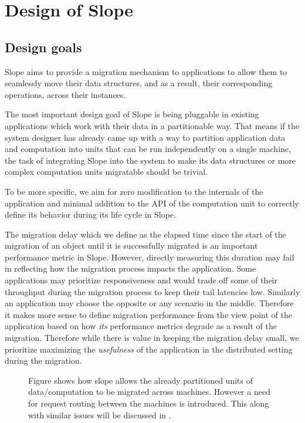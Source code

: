 \chapter{Design of Slope}
\label{chap:design}


\section{Design goals}

Slope aims to provide a migration mechanism to applications to allow them to
seamlessly move their data structures, and as a result, their corresponding
operations, across their instances.

The most important design goal of Slope is being pluggable in existing
applications which work with their data in a partitionable way. That means if
the system designer has already came up with a way to partition
application data and computation into units that can be run independently on a
single machine, the task of integrating Slope into the system to make its data
structures or more complex computation units migratable should be trivial.

To be more specific, we aim for zero modification to the internals of the
application and minimal addition to the API of the computation unit to
correctly define its behavior during its life cycle in Slope.

The migration delay which we define as the elapsed time since the start of the
migration of an object until it is successfully migrated is an important
performance metric in Slope. However, directly measuring this duration may fail
in reflecting how the migration process impacts the application. Some
applications may prioritize responsiveness and would trade off some of their
throughput during the migration process to keep their tail latencies low.
Similarly an application may choose the opposite or any scenario in the middle.
Therefore it makes more sense to define migration performance from the view
point of the application based on how \emph{its} performance metrics degrade
as a result of the migration. Therefore while there is value in keeping the
migration delay small, we prioritize maximizing the \emph{usefulness} of the
application in the distributed setting during the migration.

\begin{figure}[H]
\centering

\caption{
    Figure shows how slope allows the already partitioned units of
    data/computation to be migrated across machines. However a need for request
    routing between the machines is introduced. This along with similar issues
    will be discussed in .
}
\label{fig:designgoalspluggable}
\end{figure}


